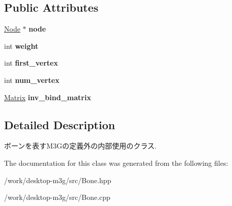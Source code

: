 \subsection*{Public Attributes}
\begin{CompactItemize}
\item 
\hypertarget{classm3g_1_1Bone_b88cd70dad2e152cea983610f2a16e68}{
\hyperlink{classm3g_1_1Node}{Node} $\ast$ \textbf{node}}
\label{classm3g_1_1Bone_b88cd70dad2e152cea983610f2a16e68}

\item 
\hypertarget{classm3g_1_1Bone_a01147b1f07072d246c76dc85d69df7c}{
int \textbf{weight}}
\label{classm3g_1_1Bone_a01147b1f07072d246c76dc85d69df7c}

\item 
\hypertarget{classm3g_1_1Bone_f6fef1fff206a6d6fcfcc1287b45ace6}{
int \textbf{first\_\-vertex}}
\label{classm3g_1_1Bone_f6fef1fff206a6d6fcfcc1287b45ace6}

\item 
\hypertarget{classm3g_1_1Bone_f130b7ed1451b2713ca985fd292e2e4a}{
int \textbf{num\_\-vertex}}
\label{classm3g_1_1Bone_f130b7ed1451b2713ca985fd292e2e4a}

\item 
\hypertarget{classm3g_1_1Bone_564e81227889d6b0b01e707d49f26f10}{
\hyperlink{classm3g_1_1Matrix}{Matrix} \textbf{inv\_\-bind\_\-matrix}}
\label{classm3g_1_1Bone_564e81227889d6b0b01e707d49f26f10}

\end{CompactItemize}


\subsection{Detailed Description}
ボーンを表すM3Gの定義外の内部使用のクラス. 

The documentation for this class was generated from the following files:\begin{CompactItemize}
\item 
/work/desktop-m3g/src/Bone.hpp\item 
/work/desktop-m3g/src/Bone.cpp\end{CompactItemize}
